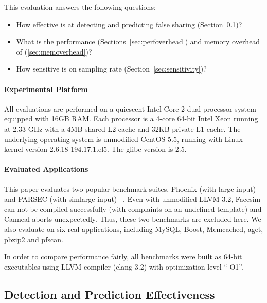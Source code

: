 \label{sec:evaluation}

This evaluation answers the following questions:
\begin{itemize}
\item
  How effective is \Predator{} at detecting and predicting false sharing (Section~\ref{sec:effective})?

\item
  What is the performance (Sections~\ref{sec:perfoverhead}) and memory overhead of \Predator{} (\ref{sec:memoverhead})?

\item 
  How sensitive is \Predator{} on sampling rate (Section~\ref{sec:sensitivity})? 
 
\end{itemize}

\paragraph{Experimental Platform} All evaluations are performed on a quiescent Intel Core 2 dual-processor system equipped with 
16GB RAM. Each processor is a 4-core 64-bit Intel Xeon running at 2.33 GHz with a 4MB shared L2 cache and 32KB private L1 cache. The underlying operating system is unmodified CentOS 5.5, running with Linux kernel version 2.6.18-194.17.1.el5. The glibc version is 2.5. %

\paragraph{Evaluated Applications} 
This paper evaluates two popular benchmark suites,
Phoenix (with large input) ~\cite{phoenix-hpca} and PARSEC (with simlarge input) ~\cite{parsec}. Even with unmodified LLVM-3.2, Facesim can not be compiled successfully (with complaints on an undefined template) and Canneal aborts unexpectedly. Thus, these two benchmarks are excluded here.
We also evaluate \Predator{} on six real applications, including MySQL, Boost, Memcached, aget, pbzip2 and pfscan.

In order to compare performance fairly, all benchmarks were built as 64-bit executables 
using LLVM compiler (clang-3.2) with optimization level ``-O1''.

\subsection{Detection and Prediction Effectiveness}
\label{sec:effective}

